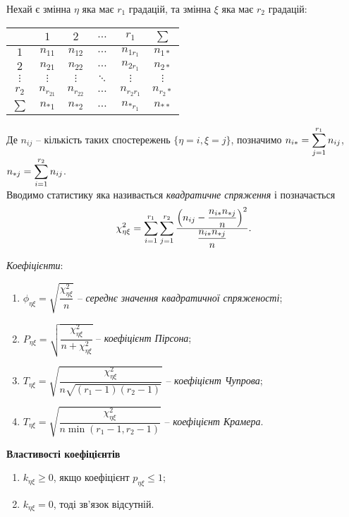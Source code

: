 Нехай є змінна $\eta$ яка має $r_1$ градацій, та змінна $\xi$ яка має $r_2$ градацій:

\begin{table}[H]
	\centering
	\begin{tabular}{|c|c|c|c|c|c|}
	\hline
	& $1$ & $2$ & $\ldots$ & $r_1$ & $\sum$ \\ \hline
	$1$ & $n_{11}$ & $n_{12}$ & $\ldots$ & $n_{1r_1}$ & $n_{1*}$ \\ \hline
	$2$ & $n_{21}$ & $n_{22}$ & $\ldots$ & $n_{2r_1}$ & $n_{2*}$ \\ \hline
	$\vdots$ & $\vdots$ & $\vdots$ & $\ddots$ & $\vdots$ & $\vdots$ \\ \hline
	$r_2$ & $n_{r_21}$ & $n_{r_22}$ & $\ldots$ & $n_{r_2r_1}$ & $n_{r_2*}$ \\ \hline
	$\sum$ & $n_{*1}$ & $n_{*2}$ & $\ldots$ & $n_{*r_1}$ & $n_{**}$ \\ \hline
	\end{tabular}
\end{table}

Де $n_{ij}$ -- кількість таких спостережень $\{\eta=i,\xi=j\}$, позначимо $n_{i*} = \displaystyle\sum\limits_{j=1}^{r_1} n_{ij}$, $n_{*j} = \displaystyle\sum\limits_{i=1}^{r_2} n_{ij}$. \\

Вводимо статистику яка називається \textit{квадратичне спряження} і позначається \[ \chi_{\eta\xi}^2 = \displaystyle\sum\limits_{i=1}^{r_1} \displaystyle\sum\limits_{j=1}^{r_2} \dfrac{\left(n_{ij}-\dfrac{n_{i*}n_{*j}}{n}\right)^2}{\dfrac{n_{i*}n_{*j}}{n}}. \]

\textit{Коефіцієнти}:
\begin{enumerate}
	\item $\phi_{\eta\xi} = \sqrt{\dfrac{\chi_{\eta\xi}^2}{n}}$ -- \textit{середнє значення квадратичної спряженості};
	\item $P_{\eta\xi}=\sqrt{\dfrac{\chi_{\eta\xi}^2}{n+\chi_{\eta\xi}^2}}$ -- \textit{коефіцієнт Пірсона};
	\item $T_{\eta\xi}=\sqrt{\dfrac{\chi_{\eta\xi}^2}{n\sqrt{(r_1-1)(r_2-1)}}}$ -- \textit{коефіцієнт Чупрова};
	\item $T_{\eta\xi}=\sqrt{\dfrac{\chi_{\eta\xi}^2}{n\min(r_1-1,r_2-1)}}$ -- \textit{коефіцієнт Крамера}.
\end{enumerate}

\textbf{Властивості коефіцієнтів}
\begin{enumerate}
	\item $k_{\eta\xi}\ge0$, якщо коефіцієнт $p_{\eta\xi} \le 1$;
	\item $k_{\eta\xi}=0$, тоді зв'язок відсутній.
\end{enumerate}
